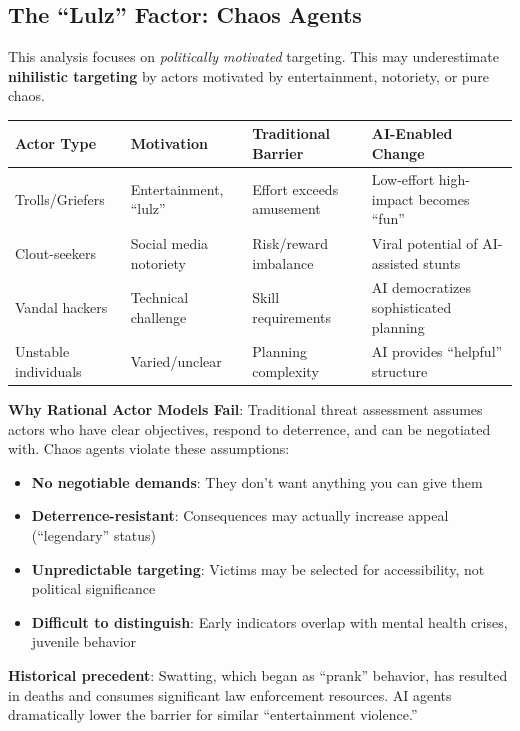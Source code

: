 \documentclass[11pt,letterpaper]{article}
\begin{document}
\subsection{The ``Lulz'' Factor: Chaos Agents}

This analysis focuses on \textit{politically motivated} targeting. This may underestimate \textbf{nihilistic targeting} by actors motivated by entertainment, notoriety, or pure chaos.

\begin{center}
\small
\begin{tabular}{L{2.5cm}L{2.5cm}L{3cm}L{4cm}}
\toprule
\textbf{Actor Type} & \textbf{Motivation} & \textbf{Traditional Barrier} & \textbf{AI-Enabled Change} \\
\midrule
Trolls/Griefers & Entertainment, ``lulz'' & Effort exceeds amusement & Low-effort high-impact becomes ``fun'' \\
Clout-seekers & Social media notoriety & Risk/reward imbalance & Viral potential of AI-assisted stunts \\
Vandal hackers & Technical challenge & Skill requirements & AI democratizes sophisticated planning \\
Unstable individuals & Varied/unclear & Planning complexity & AI provides ``helpful'' structure \\
\bottomrule
\end{tabular}
\end{center}

\textbf{Why Rational Actor Models Fail}: Traditional threat assessment assumes actors who have clear objectives, respond to deterrence, and can be negotiated with. Chaos agents violate these assumptions:

\begin{itemize}
  \item \textbf{No negotiable demands}: They don't want anything you can give them
  \item \textbf{Deterrence-resistant}: Consequences may actually increase appeal (``legendary'' status)
  \item \textbf{Unpredictable targeting}: Victims may be selected for accessibility, not political significance
  \item \textbf{Difficult to distinguish}: Early indicators overlap with mental health crises, juvenile behavior
\end{itemize}

\textbf{Historical precedent}: Swatting, which began as ``prank'' behavior, has resulted in deaths and consumes significant law enforcement resources. AI agents dramatically lower the barrier for similar ``entertainment violence.''
\end{document}
